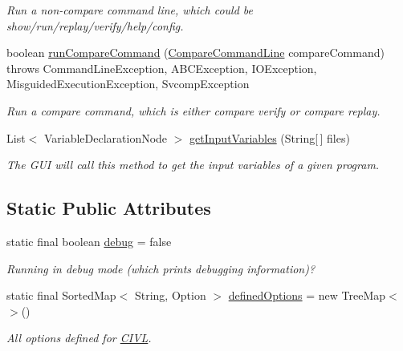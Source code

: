 \begin{DoxyCompactItemize}
\begin{DoxyCompactList}\small\item\em Run a non-\/compare command line, which could be show/run/replay/verify/help/config. \end{DoxyCompactList}\item 
boolean \hyperlink{classedu_1_1udel_1_1cis_1_1vsl_1_1civl_1_1run_1_1IF_1_1UserInterface_a854316704e112e1b70713409adc459b3}{run\+Compare\+Command} (\hyperlink{classedu_1_1udel_1_1cis_1_1vsl_1_1civl_1_1run_1_1common_1_1CompareCommandLine}{Compare\+Command\+Line} compare\+Command)  throws Command\+Line\+Exception, A\+B\+C\+Exception, I\+O\+Exception, 			\+Misguided\+Execution\+Exception, Svcomp\+Exception 
\begin{DoxyCompactList}\small\item\em Run a compare command, which is either compare verify or compare replay. \end{DoxyCompactList}\item 
List$<$ Variable\+Declaration\+Node $>$ \hyperlink{classedu_1_1udel_1_1cis_1_1vsl_1_1civl_1_1run_1_1IF_1_1UserInterface_ab9eda847ac4ad05aac413c66b0f33e91}{get\+Input\+Variables} (String\mbox{[}$\,$\mbox{]} files)
\begin{DoxyCompactList}\small\item\em The G\+U\+I will call this method to get the input variables of a given program. \end{DoxyCompactList}\end{DoxyCompactItemize}
\subsection*{Static Public Attributes}
\begin{DoxyCompactItemize}
\item 
\hypertarget{classedu_1_1udel_1_1cis_1_1vsl_1_1civl_1_1run_1_1IF_1_1UserInterface_a3c956a567775cef4e13af0cdc3f3657f}{}static final boolean \hyperlink{classedu_1_1udel_1_1cis_1_1vsl_1_1civl_1_1run_1_1IF_1_1UserInterface_a3c956a567775cef4e13af0cdc3f3657f}{debug} = false\label{classedu_1_1udel_1_1cis_1_1vsl_1_1civl_1_1run_1_1IF_1_1UserInterface_a3c956a567775cef4e13af0cdc3f3657f}

\begin{DoxyCompactList}\small\item\em Running in debug mode (which prints debugging information)? \end{DoxyCompactList}\item 
static final Sorted\+Map$<$ String, Option $>$ \hyperlink{classedu_1_1udel_1_1cis_1_1vsl_1_1civl_1_1run_1_1IF_1_1UserInterface_a4a8f3dbc6341e970930ebec3d887d0f9}{defined\+Options} = new Tree\+Map$<$$>$()
\begin{DoxyCompactList}\small\item\em All options defined for \hyperlink{classedu_1_1udel_1_1cis_1_1vsl_1_1civl_1_1CIVL}{C\+I\+V\+L}. \end{DoxyCompactList}\end{DoxyCompactItemize}


